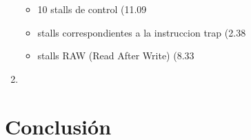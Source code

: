 \documentclass[a4paper,11pt]{article}
\begin{document}
\begin{enumerate}
\begin{itemize}
 \item 10 stalls de control (11.09%
 \item  stalls correspondientes a la instruccion trap (2.38%
 \item stalls RAW (Read After Write) (8.33%
\end{itemize}


\item




\end{enumerate}

\section{Conclusi\'on}
\end{document}

